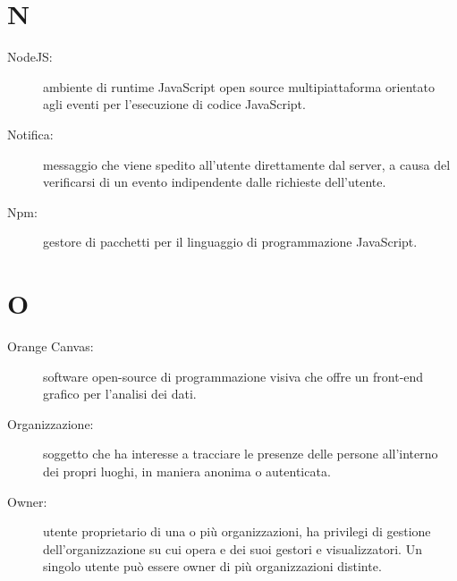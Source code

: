 \documentclass{article}
\begin{document}
	\section{N}
	\begin{description}
		\item[NodeJS:] ambiente di runtime JavaScript open source multipiattaforma orientato agli eventi per l'esecuzione di codice JavaScript.
		\item[Notifica:] messaggio che viene spedito all'utente direttamente dal server, a causa del verificarsi di un evento indipendente dalle richieste dell'utente.
		\item[Npm:] gestore di pacchetti per il linguaggio di programmazione JavaScript.
	\end{description}
	\newpage
	\section{O}
	\begin{description}
		\item[Orange Canvas:] software open-source di programmazione visiva che offre un front-end grafico per l'analisi dei dati.
		\item[Organizzazione:] soggetto che ha interesse a tracciare le presenze delle persone all'interno dei propri luoghi, in maniera anonima o autenticata.
		\item[Owner:] utente proprietario di una o più organizzazioni, ha privilegi di gestione dell'organizzazione su cui opera e dei suoi gestori e visualizzatori. Un singolo utente può essere owner di più organizzazioni distinte.
	\end{description}
	\newpage
\end{document}
